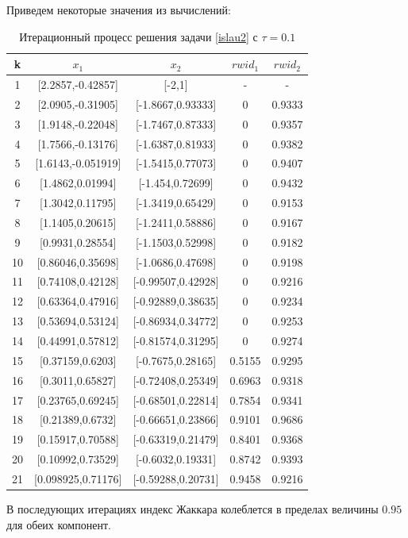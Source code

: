 \documentclass[12pt,a4paper]{article}
\begin{document}
Приведем некоторые значения из вычислений:
\begin{table}[H]
    \centering
    \begin{tabular}{|c|c|c|c|c|}
        \hline
        k & $x_1$ & $x_2$ & $rwid_1$ & $rwid_2$\\\hline
        1 & [2.2857,-0.42857] & [-2,1] & - & -\\\hline
        2 & [2.0905,-0.31905] & [-1.8667,0.93333] & 0 & 0.9333\\\hline
        3 & [1.9148,-0.22048] & [-1.7467,0.87333] & 0 & 0.9357\\\hline
        4 & [1.7566,-0.13176] & [-1.6387,0.81933] & 0 & 0.9382\\\hline
        5 & [1.6143,-0.051919] & [-1.5415,0.77073] & 0 & 0.9407\\\hline
        6 & [1.4862,0.01994] & [-1.454,0.72699] & 0 & 0.9432\\\hline
        7 & [1.3042,0.11795] & [-1.3419,0.65429] & 0 & 0.9153\\\hline
        8 & [1.1405,0.20615] & [-1.2411,0.58886] & 0 & 0.9167\\\hline
        9 & [0.9931,0.28554] & [-1.1503,0.52998] & 0 & 0.9182\\\hline
        10 & [0.86046,0.35698] & [-1.0686,0.47698] & 0 & 0.9198\\\hline
        11 & [0.74108,0.42128] & [-0.99507,0.42928] & 0 & 0.9216\\\hline
        12 & [0.63364,0.47916] & [-0.92889,0.38635] & 0 & 0.9234\\\hline
        13 & [0.53694,0.53124] & [-0.86934,0.34772] & 0 & 0.9253\\\hline
        14 & [0.44991,0.57812] & [-0.81574,0.31295] & 0 & 0.9274\\\hline
        15 & [0.37159,0.6203] & [-0.7675,0.28165] & 0.5155 & 0.9295\\\hline
        16 & [0.3011,0.65827] & [-0.72408,0.25349] & 0.6963 & 0.9318\\\hline
        17 & [0.23765,0.69245] & [-0.68501,0.22814] & 0.7854 & 0.9341\\\hline
        18 & [0.21389,0.6732] & [-0.66651,0.23866] & 0.9101 & 0.9686\\\hline
        19 & [0.15917,0.70588] & [-0.63319,0.21479] & 0.8401 & 0.9368\\\hline
        20 & [0.10992,0.73529] & [-0.6032,0.19331] & 0.8742 & 0.9393\\\hline
        21 & [0.098925,0.71176] & [-0.59288,0.20731] & 0.9458 & 0.9216\\\hline
    \end{tabular}
    \caption{Итерационный процесс решения задачи \eqref{islau2} с $\tau=0.1$}
\end{table}
В последующих итерациях индекс Жаккара колеблется в пределах величины $0.95$ для обеих компонент.
\end{document}
